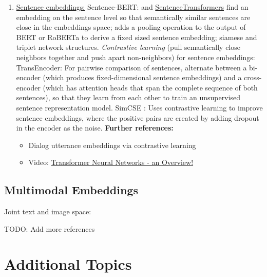 \documentclass[11pt, a4paper]{amsart}
\begin{document}
\begin{enumerate}[resume]
    \item \underline{Sentence embeddings:}
    \newline
    Sentence-BERT: \cite{DBLP:journals/corr/abs-1908-10084} and \href{https://www.sbert.net/}{SentenceTransformers}
    find an embedding on the sentence level so that semantically similar sentences are close in the embeddings space;
    adds a pooling operation to the output of BERT or RoBERTa to derive a fixed sized sentence embedding;
    siamese and triplet network structures.
    \newline
    \emph{Contrastive learning} (pull semantically close neighbors together and push apart non-neighbors) for sentence embeddings:
    \newline
    TransEncoder: For pairwise comparison of sentences, \cite{DBLP:journals/corr/abs-2109-13059} alternate between a bi-encoder (which produces fixed-dimensional sentence embeddings) and a cross-encoder (which has attention heads that span the complete sequence of both sentences), so that they learn from each other to train an unsupervised sentence representation model.
    \newline
    SimCSE \cite{DBLP:journals/corr/abs-2104-08821}: Uses contrastive learning to improve sentence embeddings, where the positive pairs are created by adding dropout in the encoder as the noise.
    \newline
    \textbf{Further references:}
    \begin{itemize}
        \item Dialog utterance embeddings via contrastive learning \cite{https://doi.org/10.48550/arxiv.2205.13568}
        \item Video: \href{https://youtu.be/O3xbVmpdJwU}{Transformer Neural Networks - an Overview!}
    \end{itemize}
\end{enumerate}

\subsection{Multimodal Embeddings}

Joint text and image space:
\cite{DBLP:journals/corr/abs-2111-07180}

TODO: Add more references

\section{Additional Topics}
\end{document}
